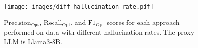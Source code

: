 \begin{figure}[t]
    \centering
    \texttt{[image: images/diff\_hallucination\_rate.pdf]}
    \caption{
    $\mathrm{Precision}_\mathrm{Opt}$, $\mathrm{Recall}_\mathrm{Opt}$, and $\mathrm{F1}_\mathrm{Opt}$ scores for each approach performed on data with different hallucination rates. The proxy LLM is Llama3-8B.
    }
    \label{fig:eval_halluc_level}
\end{figure}